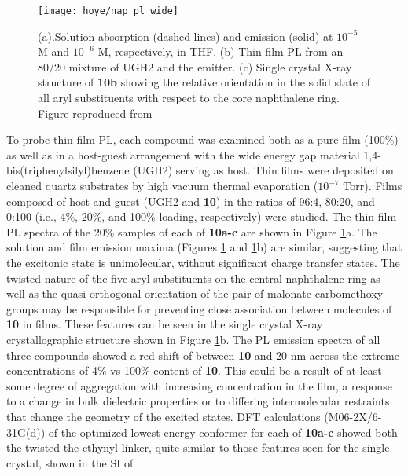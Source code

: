 \documentclass[../thesis.tex]{subfiles}
\begin{document}
\begin{figure}[ht]
\centering
\texttt{[image: hoye/nap\_pl\_wide]}
\caption{(a).Solution absorption (dashed lines) and emission (solid) at $10^{-5}$ M and $10^{-6}$ M, respectively, in THF. (b) Thin film PL from an 80/20 mixture of UGH2 and the emitter.  (c) Single crystal X-ray structure of \textbf{10b} showing the relative orientation in the solid state of all aryl substituents with respect to the core naphthalene ring.  Figure reproduced from \textcite{Xu2016} }
\label{fig:hoye_nap_pl}
\end{figure}

To probe thin film PL, each compound was examined both as a pure film (100\%) as well as in a host-guest arrangement with the wide energy gap material 1,4-bis(triphenylsilyl)benzene (UGH2) serving as host. 
Thin films were deposited on cleaned quartz substrates by high vacuum thermal evaporation ($10^{-7}$ Torr). 
Films composed of host and guest (UGH2 and \textbf{10}) in the ratios of 96:4, 80:20, and 0:100 (i.e., 4\%, 20\%, and 100\% loading, respectively) were studied. 
The thin film PL spectra of the 20\% samples of each of \textbf{10a-c} are shown in Figure \ref{fig:hoye_nap_pl}a. 
The solution and film emission maxima (Figures \ref{fig:hoye_nap_pl} and \ref{fig:hoye_nap_pl}b) are similar, suggesting that the excitonic state is unimolecular, without significant charge transfer states.
The twisted nature of the five aryl substituents on the central naphthalene ring as well as the quasi-orthogonal orientation of the pair of malonate carbomethoxy groups may be responsible for preventing close association between molecules of \textbf{10} in films. 
These features can be seen in the single crystal X-ray crystallographic structure shown in Figure \ref{fig:hoye_nap_pl}b. 
The PL emission spectra of all three compounds showed a red shift of between \textbf{10} and 20 nm across the extreme concentrations of 4\% vs 100\% content of \textbf{10}. 
This could be a result of at least some degree of aggregation with increasing concentration in the film, a response to a change in bulk dielectric properties or to differing intermolecular restraints that change the geometry of the excited states. 
DFT calculations (M06-2X/6-31G(d)) of the optimized lowest energy conformer for each of \textbf{10a-c} showed both the twisted the ethynyl linker, quite similar to those features seen for the single crystal, shown in the SI of \textcite{Xu2016}. 
\end{document}
